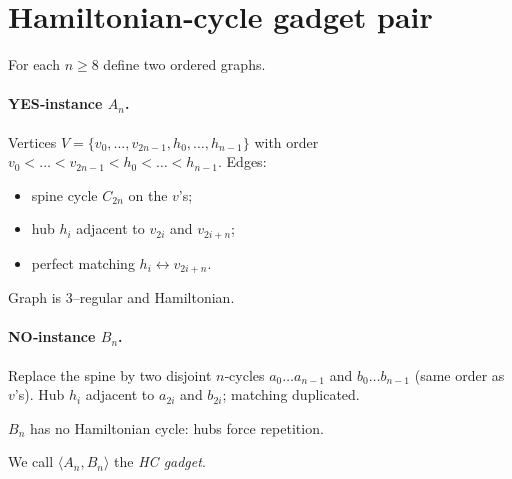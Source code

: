 \section{Hamiltonian‐cycle gadget pair}\label{P:gadget}

For each $n\ge8$ define two ordered graphs.

\paragraph{\textbf{YES‐instance $A_{n}$.}}
Vertices $V=\{v_{0},\dots,v_{2n-1},h_{0},\dots,h_{n-1}\}$ with order
$v_{0}<\dots<v_{2n-1}<h_{0}<\dots<h_{n-1}$.
Edges:
\begin{itemize}
  \item spine cycle $C_{2n}$ on the $v$'s;
  \item hub $h_{i}$ adjacent to $v_{2i}$ and $v_{2i+n}$;
  \item perfect matching $h_{i}\!\leftrightarrow\!v_{2i+n}$.
\end{itemize}
Graph is 3–regular and Hamiltonian.

\paragraph{\textbf{NO‐instance $B_{n}$.}}
Replace the spine by two disjoint $n$‐cycles
$a_{0}\dots a_{n-1}$ and $b_{0}\dots b_{n-1}$ (same order as $v$'s).
Hub $h_{i}$ adjacent to $a_{2i}$ and $b_{2i}$; matching duplicated.

$B_{n}$ has no Hamiltonian cycle: hubs force repetition.

We call $\langle A_{n},B_{n}\rangle$ the \emph{HC gadget}. 